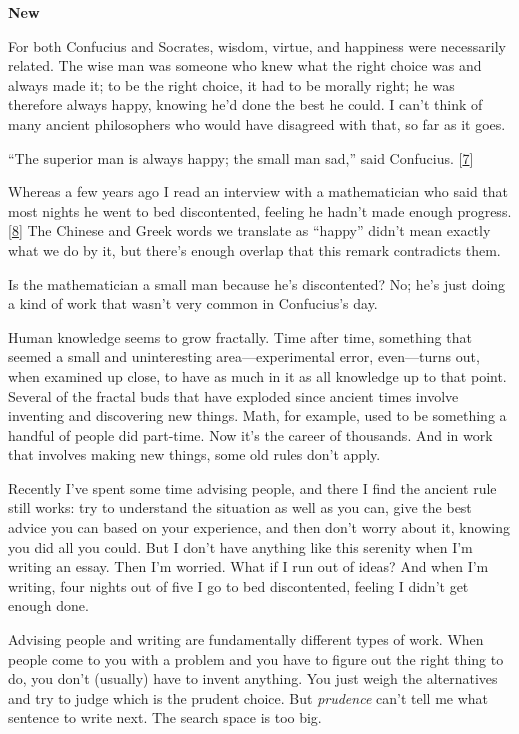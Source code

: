 \textbf{New}

For both Confucius and Socrates, wisdom, virtue, and happiness were
necessarily related. The wise man was someone who knew what the right
choice was and always made it; to be the right choice, it had to be
morally right; he was therefore always happy, knowing he'd done the best
he could. I can't think of many ancient philosophers who would have
disagreed with that, so far as it goes.

``The superior man is always happy; the small man sad,'' said Confucius.
{[}\hyperref[f7n]{7}{]}

Whereas a few years ago I read an interview with a mathematician who
said that most nights he went to bed discontented, feeling he hadn't
made enough progress. {[}\hyperref[f8n]{8}{]} The Chinese and Greek
words we translate as ``happy'' didn't mean exactly what we do by it,
but there's enough overlap that this remark contradicts them.

Is the mathematician a small man because he's discontented? No; he's
just doing a kind of work that wasn't very common in Confucius's day.

Human knowledge seems to grow fractally. Time after time, something that
seemed a small and uninteresting area---experimental error, even---turns
out, when examined up close, to have as much in it as all knowledge up
to that point. Several of the fractal buds that have exploded since
ancient times involve inventing and discovering new things. Math, for
example, used to be something a handful of people did part-time. Now
it's the career of thousands. And in work that involves making new
things, some old rules don't apply.

Recently I've spent some time advising people, and there I find the
ancient rule still works: try to understand the situation as well as you
can, give the best advice you can based on your experience, and then
don't worry about it, knowing you did all you could. But I don't have
anything like this serenity when I'm writing an essay. Then I'm worried.
What if I run out of ideas? And when I'm writing, four nights out of
five I go to bed discontented, feeling I didn't get enough done.

Advising people and writing are fundamentally different types of work.
When people come to you with a problem and you have to figure out the
right thing to do, you don't (usually) have to invent anything. You just
weigh the alternatives and try to judge which is the prudent choice. But
\emph{prudence} can't tell me what sentence to write next. The search
space is too big.

